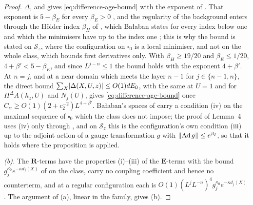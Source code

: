 \documentclass[11pt]{preprint}
\DeclarePairedDelimiter{\abs}{\lvert}{\rvert}
\DeclarePairedDelimiter{\norm}{\lVert}{\rVert}
\numberwithin{equation}{section}
\theoremstyle{definition}
\theoremstyle{remark}
\theoremstyle{plain}
\begin{document}
\begin{proof}
$\Delta$, and gives \eqref{eq:difference-age-bound} with the exponent of \cite[(3.67), p.~283]{BalabanCRE}. That exponent is $5 - \beta_E$ for every $\beta_E > 0$ \cite[p.~283, l.~31]{BalabanCRE}, and the regularity of the background enters through the H\"older index $\beta_H$ of \cite[(3.27), (3.32), (4.18)]{BalabanRG1}, which Ba{\l}aban states for every index below one and which the minimisers have up to the index one \cite[Theorem~1, (9), p.~279]{BalabanVAR}; this is why the bound is stated on $\mathcal S_z$, where the configuration on $\square_0$ is a local minimiser, and not on the whole class, which bounds first derivatives only. With $\beta_H \geq 19/20$ and $\beta_E \leq 1/20$, $4 + \beta' < 5 - \beta_E$, and since $L^{j-n} \leq 1$ the bound holds with the exponent $4 + \beta'$. At $n = j$, and at a near domain which meets the layer $n - 1$ for $j \in \{n - 1, n\}$, the direct bound $\sum_X\abs{\Delta(X, U, z)} \leq O(1)dE_0$, with the same at $U = 1$ and for $\Pi^\Delta A(h_z, U)$ and $N_j(U)$, gives \eqref{eq:difference-age-bound} once $C_\alpha \geq O(1)(2 + c_2^{-2})L^{4+\beta'}$. Ba{\l}aban's spaces of \cite[p.~277, l.~34]{BalabanRG1} carry a condition (iv) on the maximal sequence of $\square_0$ which the class does not impose; the proof of Lemma~4 uses (iv) only through \cite[(3.40)]{BalabanRG1}, and on $\mathcal S_z$ this is the configuration's own condition (iii) up to the adjoint action of a gauge transformation $g$ with $\norm{\operatorname{Ad}g} \leq e^{\beta_I}$, so that it holds where the proposition is applied.

\emph{(b).} The $\mathbf R$-terms have the properties (i)--(iii) of the $\mathbf E$-terms with the bound $g_j^{\kappa_0}e^{-\kappa d_j(X)}$ of \cite[(2.31)]{BalabanCRE} on the class, carry no coupling coefficient and hence no counterterm, and at a regular configuration each is $O(1)(L^jL^{-n})^4g_j^{\kappa_0}e^{-\kappa d_j(X)}$ \cite[p.~283, ll.~34--38]{BalabanCRE}. The argument of (a), linear in the family, gives (b).


\end{proof}
\end{document}
